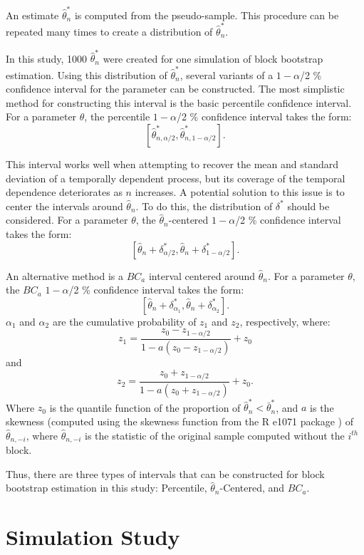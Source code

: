 \documentclass[12pt, letterpaper, titlepage]{article}
\begin{document}
An estimate $\hat\theta_n^*$ is computed from the pseudo-sample. This
procedure can be repeated many times to create a distribution of
$\hat\theta_n^*$. 


In this study, 1000 $\hat\theta_n^*$ were created for one simulation of block
bootstrap estimation. Using this distribution of $\hat\theta_n^*$, several
variants of a $1 - \alpha$/2 \% confidence interval for the parameter can be
constructed. The most simplistic method for constructing this interval is the
basic percentile confidence interval. For a parameter $\theta$, the percentile
$1 - \alpha$/2 \% confidence interval takes the form: 
\[ [\hat\theta_{n, \alpha/2}^*, \hat\theta_{n, 1 - \alpha/2}^*].\] 
	
This interval works well when attempting to recover the mean and
standard deviation of a temporally dependent process, but its coverage of
the temporal dependence deteriorates as $n$ increases. A potential solution to
this issue is to center the intervals around $\hat{\theta}_{n}$. To do this,
the distribution of $\delta^*$ should be considered. For a parameter $\theta$,
the $\hat{\theta}_{n}$-centered $1 - \alpha$/2 \% confidence interval takes
the form:
\[ [\hat{\theta}_{n} + \delta^*_{\alpha/2},
  \hat{\theta}_{n} + \delta^*_{1 - \alpha/2}].\] 
  
An alternative method is a $BC_a$ interval centered around $\hat{\theta}_{n}$.
For a parameter $\theta$, the $BC_a$ $1 - \alpha$/2 \% confidence interval
takes the form:
\[ [\hat{\theta}_{n} + \delta^*_{\alpha_1},
  \hat{\theta}_{n} + \delta^*_{\alpha_2}].\] 
$\alpha_{1}$ and $\alpha_{2}$ are the cumulative probability of $z_{1}$ and
$z_{2}$, respectively, where:
\[z_{1} = \frac{z_{0} - z_{1 - \alpha/2}}{1 - a(z_{0} - z_{1 - \alpha/2})} +
z_{0}\] and
\[z_{2} = \frac{z_{0} + z_{1 - \alpha/2}}{1 - a(z_{0} + z_{1 - \alpha/2})} +
z_{0}.\] 
Where $z_0$ is the quantile function of the proportion of
$\hat\theta_n^* < \bar\theta_n^*$, and $a$ is the skewness (computed using
the skewness function from the R e1071 package \citep{e1071}) of
$\hat{\theta}_{n, -i}$, where $\hat{\theta}_{n, -i}$ is the statistic of the
original sample computed without the $i^{th}$ block.


Thus, there are three types of intervals that can be constructed for block
bootstrap estimation in this study: Percentile, $\hat{\theta}_{n}$-Centered,
and $BC_a$. 


\section{Simulation Study}
\label{sec:simstudy}
\end{document}
